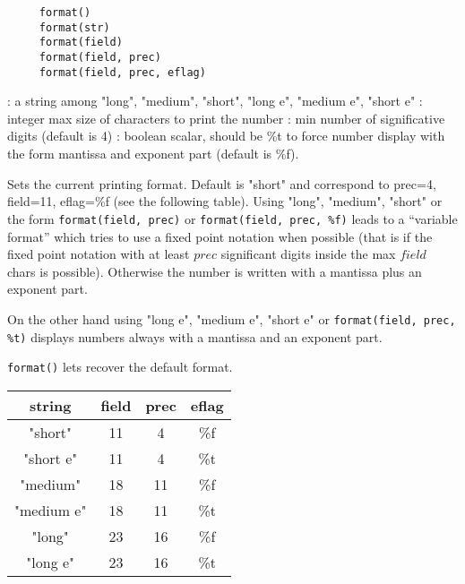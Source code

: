 

\begin{mandesc}
\end{mandesc}


\begin{calling_sequence}
   \begin{verbatim}
     format()
     format(str)
     format(field)
     format(field, prec)
     format(field, prec, eflag)
   \end{verbatim}
\end{calling_sequence}


\begin{parameters}

  \begin{varlist}
   : a string among "long", "medium", "short", "long e", "medium e", "short e"
   : integer max size of characters to print the number
   : min number of significative digits (default is 4)
   : boolean scalar, should be \%t to force number
   display with the form mantissa and exponent part (default is \%f).
  \end{varlist}

  \end{parameters}

  \begin{mandescription}
    Sets the current printing format. Default is "short" and
    correspond to prec=4, field=11, eflag=\%f (see the following
    table). Using  "long", "medium", "short" or the form \verb+format(field, prec)+
    or \verb+format(field, prec, %f)+ leads to a ``variable format'' 
    which tries to use a fixed point notation when possible (that
    is if the fixed point notation with at least $prec$ significant digits
    inside the max $field$ chars is possible). Otherwise the number is
    written with a mantissa plus an exponent part.

    On the other hand using  "long e", "medium e", "short e" or
     \verb+format(field, prec, %t)+  displays numbers always
    with a mantissa and an exponent part.

    \verb+format()+ lets recover the default format.

  \begin{tabular}{|c|c|c|c|}
     string  & field & prec & eflag \\
  \hline
   "short"   & 11    & 4    &  \%f \\
   "short e" & 11    & 4    &  \%t \\
   "medium"  & 18    & 11   &  \%f \\
   "medium e"& 18    & 11   &  \%t \\
   "long"    & 23    & 16   &  \%f \\
   "long e"  & 23    & 16   &  \%t \\
   \end{tabular}

  \end{mandescription}

